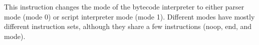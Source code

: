 This instruction changes the mode of the bytecode interpreter to either
parser mode (mode 0) or script interpreter mode (mode 1). Different modes
have mostly different instruction sets, although they share a few instructions
(noop, end, and mode).
